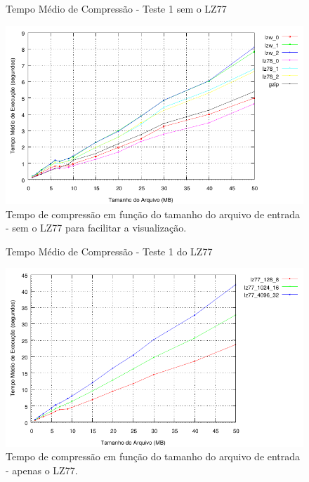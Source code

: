 \documentclass[]{article}
\begin{document}
\begin{figure}
	{\centering Tempo Médio de Compressão - Teste 1 sem o LZ77\par}
	\includegraphics{images/natural_tempo_sem_lz77}
\caption{Tempo de compressão em função do tamanho do arquivo de entrada - sem o LZ77 para facilitar a visualização.}
\label{fig:e1}
\end{figure}

\begin{figure}
	{\centering Tempo Médio de Compressão - Teste 1 do LZ77\par}
	\includegraphics{images/natural_tempo_com_lz77}
\caption{Tempo de compressão em função do tamanho do arquivo de entrada - apenas o LZ77.}
\label{fig:e2}
\end{figure}
\end{document}
